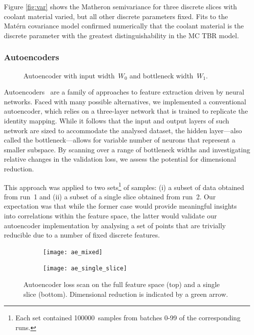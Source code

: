 Figure \cref{fig:var} shows the Matheron semivariance \cite{Matheron1963} for three discrete slices with coolant material varied, but all other discrete parameters fixed. Fits \cite{KrigingFig} to the Matérn covariance model confirmed numerically that the coolant material is the discrete parameter with the greatest distinguishability in the MC TBR model. 


\subsubsection{Autoencoders}

\begin{figure}
	\centering
	\vspace{-5ex}
	{\footnotesize {}}
	\caption{Autoencoder with input width~$W_0$ and bottleneck width~$W_1$.}
	\label{fig:autoencoder}
	\vspace{-9ex}
\end{figure}

Autoencoders~\cite{SCHMIDHUBER201585} are a family of approaches to feature extraction driven by neural
networks. Faced with many possible alternatives, we implemented a conventional
autoencoder, which relies on a three-layer network that is trained to replicate
the identity mapping. While it follows that the input and output layers of such
network are sized to accommodate the analysed dataset, the
hidden layer---also called the bottleneck---allows for variable number of
neurons that represent a smaller subspace. By scanning
over a range of bottleneck widths and investigating relative changes in the
validation loss, we assess the potential for dimensional reduction.

This approach was applied to two sets\footnote{Each set contained
\num{100000}~samples from batches 0-99 of the corresponding runs.} of samples: (i) a subset of data obtained
from run~1 and (ii) a subset of a single slice obtained from run~2. Our
expectation was that while the former case would provide meaningful insights into
correlations within the feature space, the latter would validate our
autoencoder implementation by analysing a set of points that are trivially
reducible due to a number of fixed discrete features.

\begin{figure} %
	\centering
	\vspace{-1ex}
	\begin{subfigure}[b]{\linewidth}
		\texttt{[image: ae\_mixed]}
	\end{subfigure}

	\vspace{-0.2ex}

	\begin{subfigure}[b]{\linewidth}
		\texttt{[image: ae\_single\_slice]}
	\end{subfigure}

	\caption{Autoencoder loss scan on the full feature space (top) and a single slice
		(bottom). Dimensional reduction is indicated by a green arrow.}
	\label{fig:autoencoder-loss}
	\vspace{-6ex}
\end{figure}

